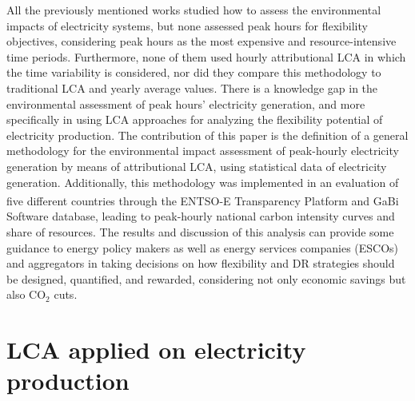 {{All the previously mentioned works studied how to assess the environmental impacts of electricity systems, but none assessed peak hours for flexibility objectives, considering peak hours as the most expensive and resource-intensive time periods. Furthermore, none of them used hourly attributional LCA in which the time variability is  considered, nor did they compare this methodology to traditional LCA and yearly average values. There is a knowledge gap in the environmental assessment of peak hours' electricity generation, and more specifically in using LCA approaches for analyzing the flexibility potential of electricity production. The contribution of this paper is the definition of a general methodology for the environmental impact assessment of peak-hourly electricity generation  by means of attributional LCA, using statistical data of electricity generation. Additionally, this methodology was implemented in an evaluation of five different countries through the ENTSO-E Transparency Platform and GaBi\textsuperscript{\textregistered} Software database, leading to peak-hourly national carbon intensity curves and share of resources. The results and discussion of this analysis can provide some guidance to energy policy makers as well as energy services companies (ESCOs) and aggregators in taking decisions on how flexibility and DR strategies should be designed, quantified, and rewarded, considering not only economic savings but also CO$_2$ cuts.}


\section{LCA applied on electricity production} \label{Methodology_text}

}
